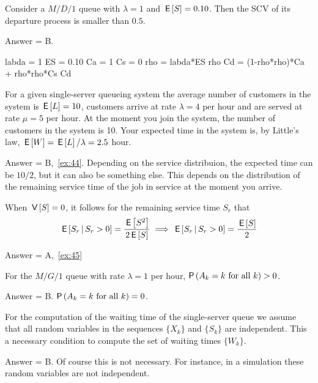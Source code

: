 \begin{exercise}[201904]
  Consider a $M/D/1$ queue with $\lambda=1$ and $\,\mathsf{E}\left[S\right] = 0.10$. Then the SCV of its departure process is smaller than $0.5$.
\begin{solution}
    Answer = B.
    \begin{pyconsole}
labda = 1
ES = 0.10
Ca = 1
Cs = 0
rho = labda*ES
rho
Cd = (1-rho*rho)*Ca + rho*rho*Cs
Cd
      
    \end{pyconsole}
\end{solution}
\end{exercise}

\begin{exercise}[201904] 
For a given single-server queueing system the average number of customers in the system is $\,\mathsf{E}\left[L\right] = 10$, customers arrive at rate $\lambda=4$ per hour and are served at rate $\mu=5$ per hour.
  At the moment you join the system, the number of customers in the system is 10.
  Your expected time in the system is, by Little's law, $\,\mathsf{E}\left[W\right] = \,\mathsf{E}\left[L\right] /\lambda = 2.5$ hour.
\begin{solution} Answer = B,~\cref{ex:44}.
    Depending on the service distribuion, the expected time can be $10/2$, but it can also be something else.
    This depends on the distribution of the remaining service time of the job in service at the moment you arrive.
\end{solution}
\end{exercise}

\begin{exercise}[201904]
  When $\,\mathsf{V}\left[S\right] = 0$, it follows for the remaining service time $S_r$ that
\begin{equation*}
\,\mathsf{E}\left[S_r\,\middle|\, S_r>0\right] = \frac{\,\mathsf{E}\left[S^2\right]}{2 \,\mathsf{E}\left[S\right]} \implies \,\mathsf{E}\left[S_r\,\middle|\, S_r>0\right] = \frac{\,\mathsf{E}\left[S\right]}2
\end{equation*}
\begin{solution} Answer = A,~\cref{ex:45}
\end{solution}
\end{exercise}


\begin{exercise}[201907]
  For the $M/G/1$ queue with rate $\lambda=1$ per hour, $\P{A_k= k \text{ for all $k$}} > 0$.  
\begin{solution}
Answer = B. $\P{A_k= k \text{ for all $k$}} = 0$. 
\end{solution}
\end{exercise}

\begin{exercise}[201907]
  For the computation of the waiting time of the single-server queue we assume that all random variables in the sequences $\{X_k\}$ and $\{S_k\}$ are independent.
  This a necessary condition to compute the set of waiting times $\{W_k\}$.
\begin{solution}
  Answer = B.
  Of course this is not necessary.
  For instance, in a simulation these random variables are not independent. 
\end{solution}
\end{exercise}


